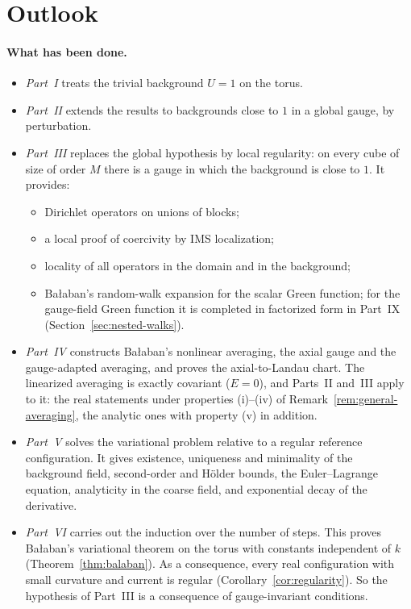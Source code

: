 \section{Outlook}\label{sec:outlook}

\paragraph{What has been done.}
\begin{itemize}
\item \emph{Part~I} treats the trivial background $U=1$ on the torus.
\item \emph{Part~II} extends the results to backgrounds close to $1$ in a global gauge, by perturbation.
\item \emph{Part~III} replaces the global hypothesis by local regularity: on every cube of size of order $M$ there is a gauge in which the background is close to $1$. It provides:
  \begin{itemize}
  \item Dirichlet operators on unions of blocks;
  \item a local proof of coercivity by IMS localization;
  \item locality of all operators in the domain and in the background;
  \item Ba\l aban's random-walk expansion for the scalar Green function; for the gauge-field Green function it is completed in factorized form in Part~IX (Section~\ref{sec:nested-walks}).
  \end{itemize}
\item \emph{Part~IV} constructs Ba\l aban's nonlinear averaging, the axial gauge and the gauge-adapted averaging, and proves the axial-to-Landau chart. The linearized averaging is exactly covariant ($E=0$), and Parts~II and~III apply to it: the real statements under properties (i)--(iv) of Remark~\ref{rem:general-averaging}, the analytic ones with property (v) in addition.
\item \emph{Part~V} solves the variational problem relative to a regular reference configuration. It gives existence, uniqueness and minimality of the background field, second-order and H\"older bounds, the Euler--Lagrange equation, analyticity in the coarse field, and exponential decay of the derivative.
\item \emph{Part~VI} carries out the induction over the number of steps. This proves Ba\l aban's variational theorem on the torus with constants independent of $k$ (Theorem~\ref{thm:balaban}). As a consequence, every real configuration with small curvature and current is regular (Corollary~\ref{cor:regularity}). So the hypothesis of Part~III is a consequence of gauge-invariant conditions.

\end{itemize}
